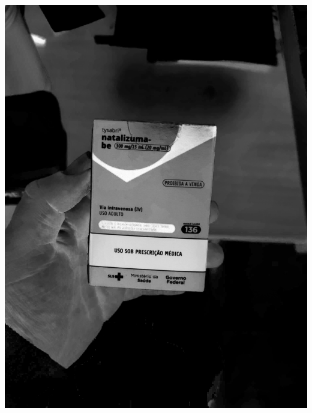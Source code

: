 \begin{frame}
\begin{columns}
\begin{column}{0.24\textwidth}
			\includegraphics[height=0.35\textheight]{../pictures/tysabri_cmyk_y_only.jpg}
			\\\vspace{\floatsep}

\end{column}
\end{columns}
\end{frame}
